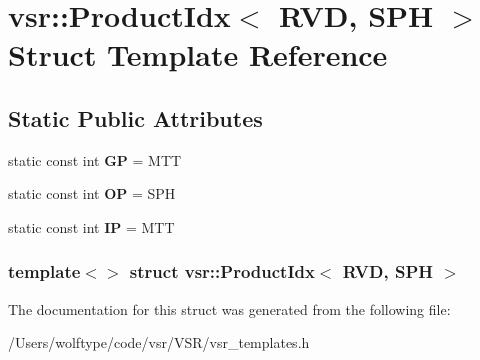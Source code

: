 \hypertarget{structvsr_1_1_product_idx_3_01_r_v_d_00_01_s_p_h_01_4}{\section{vsr\-:\-:Product\-Idx$<$ R\-V\-D, S\-P\-H $>$ Struct Template Reference}
\label{structvsr_1_1_product_idx_3_01_r_v_d_00_01_s_p_h_01_4}
}
\subsection*{Static Public Attributes}
\begin{DoxyCompactItemize}
\item 
\hypertarget{structvsr_1_1_product_idx_3_01_r_v_d_00_01_s_p_h_01_4_a3b87d7aed9481e6760dbeb671d48a5e8}{static const int {\bfseries G\-P} = M\-T\-T}\label{structvsr_1_1_product_idx_3_01_r_v_d_00_01_s_p_h_01_4_a3b87d7aed9481e6760dbeb671d48a5e8}

\item 
\hypertarget{structvsr_1_1_product_idx_3_01_r_v_d_00_01_s_p_h_01_4_a99dac0bca3bac0b0ca2db601d9416792}{static const int {\bfseries O\-P} = S\-P\-H}\label{structvsr_1_1_product_idx_3_01_r_v_d_00_01_s_p_h_01_4_a99dac0bca3bac0b0ca2db601d9416792}

\item 
\hypertarget{structvsr_1_1_product_idx_3_01_r_v_d_00_01_s_p_h_01_4_a4c9b64eb8c13593f474ddc052be30e15}{static const int {\bfseries I\-P} = M\-T\-T}\label{structvsr_1_1_product_idx_3_01_r_v_d_00_01_s_p_h_01_4_a4c9b64eb8c13593f474ddc052be30e15}

\end{DoxyCompactItemize}
\subsubsection*{template$<$$>$ struct vsr\-::\-Product\-Idx$<$ R\-V\-D, S\-P\-H $>$}



The documentation for this struct was generated from the following file\-:\begin{DoxyCompactItemize}
\item 
/\-Users/wolftype/code/vsr/\-V\-S\-R/vsr\-\_\-templates.\-h\end{DoxyCompactItemize}
